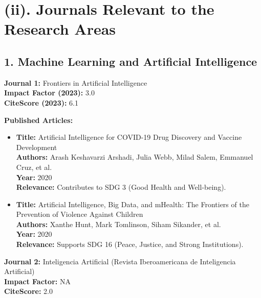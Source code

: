 \documentclass[11pt]{article}
\begin{document}
\section*{(ii). Journals Relevant to the Research Areas}

\subsection*{1. Machine Learning and Artificial Intelligence}

\textbf{Journal 1:} Frontiers in Artificial Intelligence \\
\textbf{Impact Factor (2023):} 3.0 \\
\textbf{CiteScore (2023):} 6.1

\textbf{Published Articles:}
\begin{itemize}
    \item \textbf{Title:} Artificial Intelligence for COVID-19 Drug Discovery and Vaccine Development \\
    \textbf{Authors:} Arash Keshavarzi Arshadi, Julia Webb, Milad Salem, Emmanuel Cruz, et al. \\
    \textbf{Year:} 2020 \\
    \textbf{Relevance:} Contributes to SDG 3 (Good Health and Well-being).

    \item \textbf{Title:} Artificial Intelligence, Big Data, and mHealth: The Frontiers of the Prevention of Violence Against Children \\
    \textbf{Authors:} Xanthe Hunt, Mark Tomlinson, Siham Sikander, et al. \\
    \textbf{Year:} 2020 \\
    \textbf{Relevance:} Supports SDG 16 (Peace, Justice, and Strong Institutions).
\end{itemize}

\noindent
\textbf{Journal 2:} Inteligencia Artificial (Revista Iberoamericana de Inteligencia Artificial) \\
\textbf{Impact Factor:} NA \\
\textbf{CiteScore:} 2.0
\end{document}
